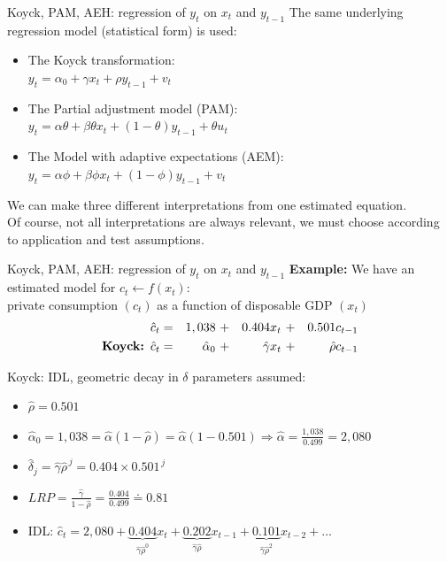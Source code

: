 \documentclass{beamer}
\begin{document}
\begin{frame}{Koyck, PAM, AEH: regression of $y_t$ on $x_t$ and $y_{t-1}$}
The same underlying regression model (statistical form) is used:

\begin{itemize}
\item The Koyck transformation:\\
$y_t = \alpha_0 + \gamma x_t + \rho y_{t-1} + v_t$\\
\smallskip
\item The Partial adjustment model (PAM):\\
$y_t = \alpha \theta + \beta \theta x_t + (1-\theta) y_{t-1} + \theta u_t$\\
\smallskip
\item The Model with adaptive expectations (AEM):\\
$y_t = \alpha \phi + \beta \phi x_{t} + (1-\phi) y_{t-1} + v_t $\\

\end{itemize}
\vspace{0.3cm}
We can make three different interpretations from one estimated equation.\\
\vspace{0.3cm}
Of course, not all interpretations are always relevant, we must choose according to application and test assumptions.
\end{frame}
\begin{frame}{Koyck, PAM, AEH: regression of $y_t$ on $x_t$ and $y_{t-1}$}
\textbf{Example:} We have an estimated model for $c_t \leftarrow f(x_t)$:\\
private consumption $(c_t)$ as a function of disposable GDP $(x_t)$
\begin{equation*}
\begin{aligned}
\hat{c}_t & = &1,038~&+ &0.404 x_t~ &+ &0.501 c_{t-1} \\
\textnormal{\textbf{Koyck:}} \,\,\, \hat{c}_t & = &\hat{\alpha}_0~&+ &\hat{\gamma} x_t~ &+ &\hat{\rho} c_{t-1} 
\end{aligned}
\end{equation*}

Koyck: IDL, geometric decay in $\delta$ parameters assumed:
\begin{itemize}
\item $\hat{\rho}=0.501$
\smallskip
\item $\hat{\alpha}_0 = 1,038 = \hat{\alpha}(1-\hat{\rho}) = \hat{\alpha}(1-0.501) 
\Rightarrow \hat{\alpha}= \frac{1,038}{0.499}=2,080$
\item $\hat{\delta}_j = \hat{\gamma} \hat{\rho}^{\,j}=0.404 \times 0.501^{\,j}$
\smallskip
\item $\textit{LRP}=\frac{\hat{\gamma}}{1-\hat{\rho}}= \frac{0.404}{0.499} \doteq 0.81 $
\smallskip
\item IDL: $\hat{c}_t = 2,080 + \underbrace{0.404}_{\hat{\gamma} \hat{\rho}^{0}} x_t + \underbrace{0.202}_{\hat{\gamma} \hat{\rho}} x_{t-1} 
+ \underbrace{0.101}_{\hat{\gamma} \hat{\rho}^{2}} x_{t-2} + \dots$
\end{itemize}
\end{frame}
\end{document}
